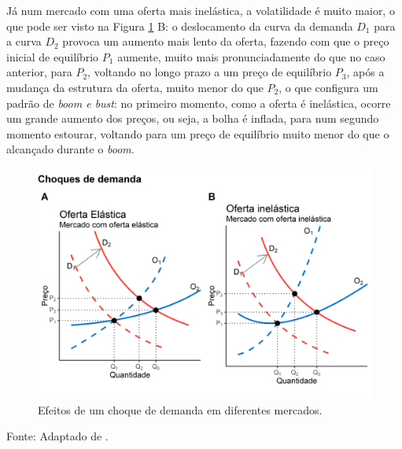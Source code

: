 \documentclass[
	12pt,				%
	oneside,			%
	a4paper,			%
	chapter=TITLE,		%
	section=TITLE,		%
	english,			%
	brazil				%
	]{abntex2}
\newcommand{\bcenter}{\begin{center}}
\newcommand{\ecenter}{\end{center}}
\begin{document}
Já num mercado com uma oferta mais inelástica, a volatilidade é muito maior, o
que pode ser visto na Figura \ref{fig:choque} B: o deslocamento da curva da
demanda \(D_1\) para a curva \(D_2\) provoca um aumento mais lento da oferta, fazendo
com que o preço inicial de equilíbrio \(P_1\) aumente, muito mais pronunciadamente
do que no caso anterior, para \(P_2\), voltando no longo prazo a um preço de
equilíbrio \(P_3\), após a mudança da estrutura da oferta, muito menor do que
\(P_2\), o que configura um padrão de \emph{boom e bust}: no primeiro momento, como a
oferta é inelástica, ocorre um grande aumento dos preços, ou seja, a bolha é
inflada, para num segundo momento estourar, voltando para um preço de equilíbrio
muito menor do que o alcançado durante o \emph{boom}.
\begin{figure}[H]

{\centering \includegraphics[width=1\linewidth]{images/choque-1} 

}

\caption{Efeitos de um choque de demanda em diferentes mercados.}\label{fig:choque}
\end{figure}
\bcenter

Fonte: Adaptado de \textcite[p.~10]{regulation}.
\ecenter
\end{document}

